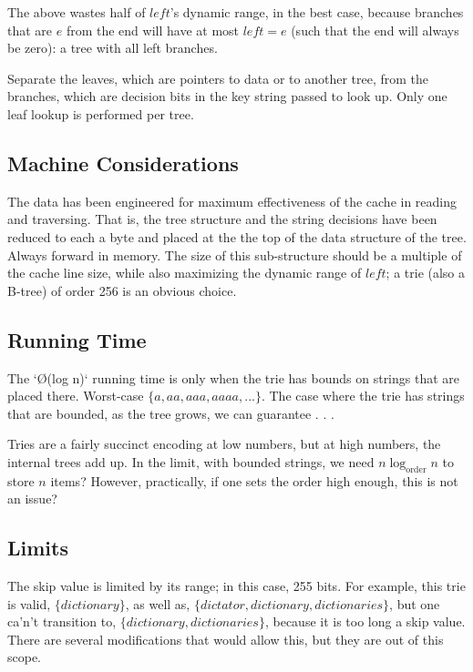 \documentclass[12pt]{article}
\begin{document}
The above wastes half of $\mathit{left}$'s dynamic range, in the best case, because branches that are $e$ from the end will have at most $\mathit{left} = e$ (such that the end will always be zero): a tree with all left branches.

 Separate the leaves, which are pointers to data or to another tree, from the branches, which are decision bits in the key string passed to look up. Only one leaf lookup is performed per tree.

\subsection{Machine Considerations}

The data has been engineered for maximum effectiveness of the cache in reading and traversing. That is, the tree structure and the string decisions have been reduced to each a byte and placed at the the top of the data structure of the tree. Always forward in memory. The size of this sub-structure should be a multiple of the cache line size, while also maximizing the dynamic range of $\mathit{left}$; a trie (also a B-tree) of order 256 is an obvious choice.\cite{sinha2004cache}

\subsection{Running Time}

The `\O(log n)` running time is only when the trie has bounds on strings that are placed there. Worst-case $\{ a, aa, aaa, aaaa, ... \}$. The case where the trie has strings that are bounded, as the tree grows, we can guarantee . . .

Tries are a fairly succinct encoding at low numbers, but at high numbers, the internal trees add up. In the limit, with bounded strings, we need $n \log_{\text{order}} n$ to store $n$ items? However, practically, if one sets the order high enough, this is not an issue?

\subsection{Limits}

The skip value is limited by its range; in this case, 255 bits. For example, this trie is valid, $\{ dictionary \}$, as well as, $\{ dictator, dictionary, dictionaries \}$, but one ca'n't transition to, $\{ dictionary, dictionaries \}$, because it is too long a skip value. There are several modifications that would allow this, but they are out of this scope.
\end{document}
